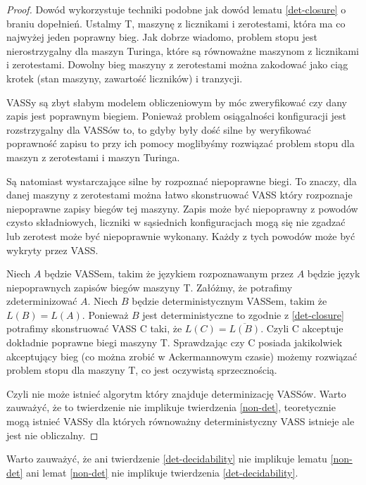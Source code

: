 \documentclass[magisterska]{pracamgr}
\newtheorem{proof}[theorem]{Dowód}
\begin{document}
    \begin{proof}
        Dowód wykorzystuje techniki podobne jak dowód lematu \ref{det-closure} o braniu dopełnień.
        Ustalmy T, maszynę z licznikami i zerotestami, która ma co najwyżej jeden poprawny bieg.
        Jak dobrze wiadomo, problem stopu jest nierostrzygalny dla maszyn Turinga, które są równoważne maszynom z licznikami i zerotestami.
        Dowolny bieg maszyny z zerotestami można zakodować jako ciąg krotek (stan maszyny, zawartość liczników) i tranzycji.

        VASSy są zbyt słabym modelem obliczeniowym by móc zweryfikować czy dany zapis jest poprawnym biegiem.
        Ponieważ problem osiągalności konfiguracji jest rozstrzygalny dla VASSów to, to gdyby były dość silne
        by weryfikować poprawność zapisu to przy ich pomocy moglibyśmy rozwiązać problem stopu dla maszyn z zerotestami i maszyn Turinga.

        Są natomiast wystarczające silne by rozpoznać niepoprawne biegi.
        To znaczy, dla danej maszyny z zerotestami można łatwo skonstruować VASS który rozpoznaje niepoprawne zapisy biegów
        tej maszyny.
        Zapis może być niepoprawny z powodów czysto składniowych, liczniki w sąsiednich konfiguracjach mogą się nie zgadzać
        lub zerotest może być niepoprawnie wykonany.
        Każdy z tych powodów może być wykryty przez VASS.


        Niech $A$ będzie VASSem, takim że językiem rozpoznawanym przez $A$ będzie język niepoprawnych zapisów biegów maszyny T.
        Załóżmy, że potrafimy zdeterminizować $A$.
        Niech $B$ będzie deterministycznym VASSem, takim że $L(B)=L(A)$.
        Ponieważ $B$ jest deterministyczne to zgodnie z \ref{det-closure} potrafimy skonstruować VASS C taki, że $L(C) = \overline{L(B)}$.
        Czyli C akceptuje dokładnie poprawne biegi maszyny T.
        Sprawdzając czy C posiada jakikolwiek akceptujący bieg (co można zrobić w Ackermannowym czasie\cite{Ackerman})
        możemy rozwiązać problem stopu dla maszyny T, co jest oczywistą sprzecznością.

        Czyli nie może istnieć algorytm który znajduje determinizację VASSów.
        Warto zauważyć, że to twierdzenie nie implikuje twierdzenia \ref{non-det}, teoretycznie mogą istnieć VASSy dla których
        równoważny deterministyczny VASS istnieje ale jest nie obliczalny.
    \end{proof}

    Warto zauważyć, że ani twierdzenie \ref{det-decidability} nie implikuje lematu \ref{non-det} ani lemat \ref{non-det}
    nie implikuje twierdzenia \ref{det-decidability}.
\end{document}
